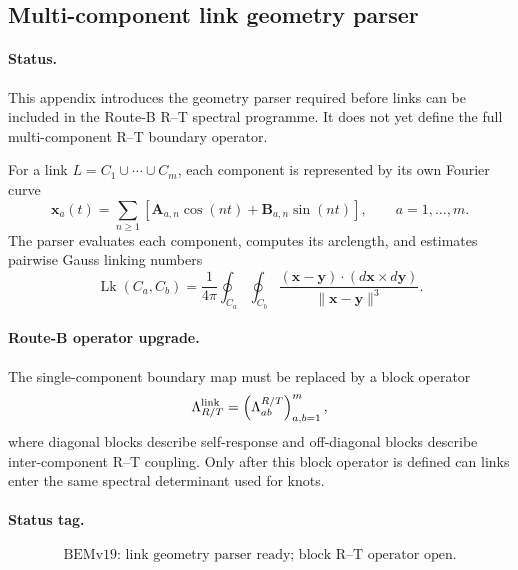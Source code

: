
\subsection{Multi-component link geometry parser}

\paragraph{Status.}
This appendix introduces the geometry parser required before links can be
included in the Route-B R--T spectral programme.  It does not yet define the
full multi-component R--T boundary operator.

For a link \(L=C_1\cup\cdots\cup C_m\), each component is represented by its
own Fourier curve
\[
\mathbf x_a(t)=
\sum_{n\ge1}
\left[
\mathbf A_{a,n}\cos(nt)+\mathbf B_{a,n}\sin(nt)
\right],
\qquad a=1,\ldots,m .
\]
The parser evaluates each component, computes its arclength, and estimates
pairwise Gauss linking numbers
\[
\operatorname{Lk}(C_a,C_b)
=
\frac{1}{4\pi}
\oint_{C_a}\oint_{C_b}
\frac{(\mathbf x-\mathbf y)\cdot(d\mathbf x\times d\mathbf y)}
{\|\mathbf x-\mathbf y\|^3}.
\]

\paragraph{Route-B operator upgrade.}
The single-component boundary map must be replaced by a block operator
\[
\Lambda^{\rm link}_{R/T}
=
\left(\Lambda^{R/T}_{ab}\right)_{a,b=1}^{m},
\]
where diagonal blocks describe self-response and off-diagonal blocks describe
inter-component R--T coupling.  Only after this block operator is defined can
links enter the same spectral determinant used for knots.

\paragraph{Status tag.}
\[
\boxed{\text{BEMv19: link geometry parser ready; block R--T operator open.}}
\]
